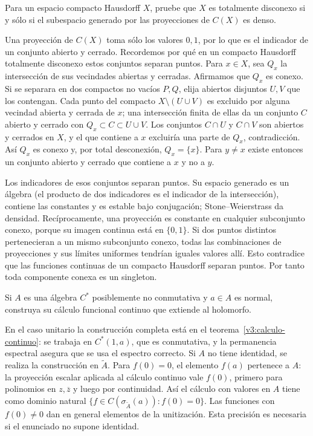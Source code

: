 \begin{ejercicio}\label{ej:v3-l26-3}
Para un espacio compacto Hausdorff $X$, pruebe que $X$ es totalmente disconexo si y sólo si el subespacio generado por las proyecciones de $C(X)$ es denso.
\end{ejercicio}
\begin{solucion}
Una proyección de $C(X)$ toma sólo los valores $0,1$, por lo que es el indicador de un conjunto abierto y cerrado. Recordemos por qué en un compacto Hausdorff totalmente disconexo estos conjuntos separan puntos. Para $x\in X$, sea $Q_x$ la intersección de sus vecindades abiertas y cerradas. Afirmamos que $Q_x$ es conexo. Si se separara en dos compactos no vacíos $P,Q$, elija abiertos disjuntos $U,V$ que los contengan. Cada punto del compacto $X\setminus(U\cup V)$ es excluido por alguna vecindad abierta y cerrada de $x$; una intersección finita de ellas da un conjunto $C$ abierto y cerrado con $Q_x\subset C\subset U\cup V$. Los conjuntos $C\cap U$ y $C\cap V$ son abiertos y cerrados en $X$, y el que contiene a $x$ excluiría una parte de $Q_x$, contradicción. Así $Q_x$ es conexo y, por total desconexión, $Q_x=\{x\}$. Para $y\ne x$ existe entonces un conjunto abierto y cerrado que contiene a $x$ y no a $y$.

Los indicadores de esos conjuntos separan puntos. Su espacio generado es un álgebra (el producto de dos indicadores es el indicador de la intersección), contiene las constantes y es estable bajo conjugación; Stone--Weierstrass da densidad. Recíprocamente, una proyección es constante en cualquier subconjunto conexo, porque su imagen continua está en $\{0,1\}$. Si dos puntos distintos pertenecieran a un mismo subconjunto conexo, todas las combinaciones de proyecciones y sus límites uniformes tendrían iguales valores allí. Esto contradice que las funciones continuas de un compacto Hausdorff separan puntos. Por tanto toda componente conexa es un singleton.
\end{solucion}

\begin{ejercicio}\label{ej:v3-l26-4}
Si $A$ es una álgebra $C^*$ posiblemente no conmutativa y $a\in A$ es normal, construya su cálculo funcional continuo que extiende al holomorfo.
\end{ejercicio}
\begin{solucion}
En el caso unitario la construcción completa está en el teorema~\ref{v3:calculo-continuo}: se trabaja en $C^*(1,a)$, que es conmutativa, y la permanencia espectral asegura que se usa el espectro correcto. Si $A$ no tiene identidad, se realiza la construcción en $\widetilde A$. Para $f(0)=0$, el elemento $f(a)$ pertenece a $A$: la proyección escalar aplicada al cálculo continuo vale $f(0)$, primero para polinomios en $z,\overline z$ y luego por continuidad. Así el cálculo con valores en $A$ tiene como dominio natural $\{f\in C(\sigma_{\widetilde A}(a)):f(0)=0\}$. Las funciones con $f(0)\ne0$ dan en general elementos de la unitización. Esta precisión es necesaria si el enunciado no supone identidad.
\end{solucion}

